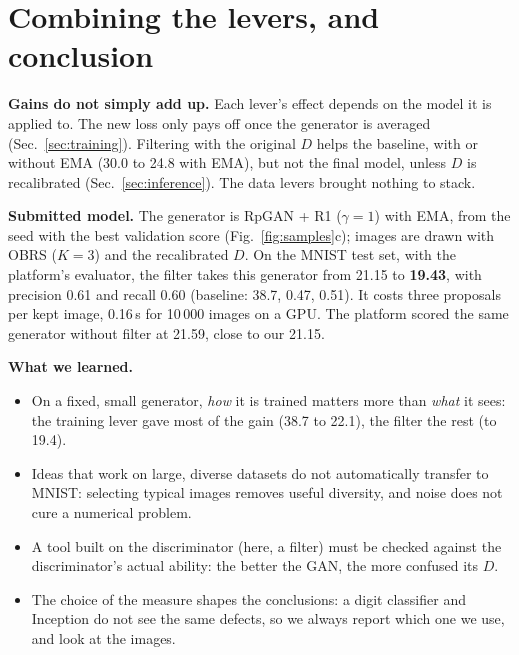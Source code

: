 \section{Combining the levers, and conclusion}\label{sec:combination}

\textbf{Gains do not simply add up.} Each lever's effect depends on the model it is applied to. The new loss only pays off
once the generator is averaged (Sec.~\ref{sec:training}). Filtering with the original $D$ helps the baseline, with or
without EMA (30.0 to 24.8 with EMA), but not the final model, unless $D$ is recalibrated (Sec.~\ref{sec:inference}). The
data levers brought nothing to stack.

\textbf{Submitted model.} The generator is RpGAN + R1 ($\gamma=1$) with EMA, from the seed with the best validation
score (Fig.~\ref{fig:samples}c); images are drawn with OBRS ($K=3$) and the recalibrated $D$. On the MNIST test set,
with the platform's evaluator, the filter takes this generator from 21.15 to \textbf{19.43}, with precision 0.61 and
recall 0.60 (baseline: 38.7, 0.47, 0.51). It costs three proposals per kept image, 0.16\,s for 10\,000 images on a GPU.
The platform scored the same generator without filter at 21.59, close to our 21.15.

\textbf{What we learned.}
\begin{itemize}
\item On a fixed, small generator, \emph{how} it is trained matters more than \emph{what} it sees: the training lever
gave most of the gain (38.7 to 22.1), the filter the rest (to 19.4).
\item Ideas that work on large, diverse datasets do not automatically transfer to MNIST: selecting typical images
removes useful diversity, and noise does not cure a numerical problem.
\item A tool built on the discriminator (here, a filter) must be checked against the discriminator's actual ability:
the better the GAN, the more confused its $D$.
\item The choice of the measure shapes the conclusions: a digit classifier and Inception do not see the same defects,
so we always report which one we use, and look at the images.
\end{itemize}

